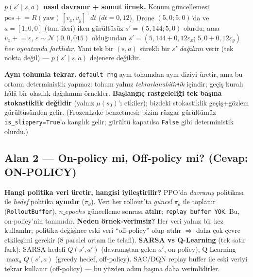 \documentclass[11pt,a4paper]{article}
\newcommand{\reff}[1]{\texttt{#1}}
\begin{document}
\textbf{$p(s'\mid s,a)$ nasıl davranır + somut örnek.} Konum güncellemesi
$\text{pos}\mathrel{+}= R(\text{yaw})\,[v_x,v_y]^\top dt$ ($dt=0{,}12$). Drone $(5{,}0;5{,}0)$'da
ve $a=[1,0,0]$ (tam ileri) iken gürültüsüz $s'=(5{,}144;5{,}0)$ olurdu; ama
$v_x\mathrel{+}=\varepsilon,\,\varepsilon\sim\mathcal{N}(0,0{,}015)$ olduğundan
$s'=(5{,}144+0{,}12\varepsilon_x;\,5{,}0+0{,}12\varepsilon_y)$ \emph{her oynatımda farklıdır}.
Yani tek bir $(s,a)$ sürekli bir $s'$ \emph{dağılımı} verir (tek nokta değil) ---
$p(s'\mid s,a)$ dejenere değildir.

\textbf{Aynı tohumla tekrar.} \reff{default\_rng} aynı tohumdan aynı diziyi üretir, ama
bu ortamı deterministik yapmaz: tohum yalnız \emph{tekrarlanabilirlik} içindir; geçiş
kuralı hâlâ bir olasılık dağılımını örnekler. \textbf{Başlangıç rastgeleliği tek başına
stokastiklik değildir} (yalnız $\mu(s_0)$'ı etkiler); bizdeki stokastiklik geçiş+gözlem
gürültüsünden gelir. (FrozenLake benzetmesi: bizim rüzgar gürültümüz \reff{is\_slippery=True}'a
karşılık gelir; gürültü kapatılsa \reff{False} gibi deterministik olurdu.)

\subsection*{Alan 2 --- On-policy mi, Off-policy mi? \textnormal{(Cevap: \textbf{ON-POLICY})}}
\textbf{Hangi politika veri üretir, hangisi iyileştirilir?} PPO'da \emph{davranış}
politikası ile \emph{hedef} politika \textbf{aynıdır} ($\pi_\theta$). Veri her rollout'ta
\emph{güncel} $\pi_\theta$ ile toplanır (\reff{RolloutBuffer}), $n\_epochs$ güncelleme
sonrası \textbf{atılır}; \reff{replay buffer YOK}. Bu, on-policy'nin tanımıdır.
\textbf{Neden örnek-verimsiz?} Her veri yalnız bir kez kullanılır; politika değişince
eski veri ``off-policy'' olup atılır $\Rightarrow$ daha çok çevre etkileşimi gerekir
(8 paralel ortam ile telafi). \textbf{SARSA vs Q-Learning} (tek satır fark): SARSA hedefi
$Q(s',a')$ (davranıştan gelen $a'$, on-policy); Q-Learning $\max_a Q(s',a)$ (greedy hedef,
off-policy). SAC/DQN replay buffer ile eski veriyi tekrar kullanır (off-policy) ---
bu yüzden adım başına daha verimlidirler.
\end{document}
